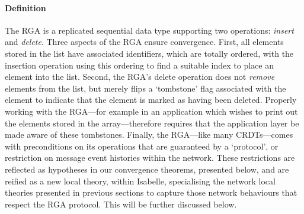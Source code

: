 \documentclass[acmlarge,review,anonymous]{acmart}\settopmatter{printfolios=true}
\begin{document}
\paragraph{Definition}
The RGA is a replicated sequential data type supporting two operations: \emph{insert} and \emph{delete}.
Three aspects of the RGA ensure convergence.
First, all elements stored in the list have associated identifiers, which are totally ordered, with the insertion operation using this ordering to find a suitable index to place an element into the list.
Second, the RGA's delete operation does not \emph{remove} elements from the list, but merely flips a `tombstone' flag associated with the element to indicate that the element is marked as having been deleted.
Properly working with the RGA---for example in an application which wishes to print out the elements stored in the array---therefore requires that the application layer be made aware of these tombstones.
Finally, the RGA---like many CRDTs---comes with preconditions on its operations that are guaranteed by a `protocol', or restriction on message event histories within the network.
These restrictions are reflected as hypotheses in our convergence theorems, presented below, and are reified as a new local theory, within Isabelle, specialising the network local theories presented in previous sections to capture those network behaviours that respect the RGA protocol.
This will be further discussed below.
\end{document}
